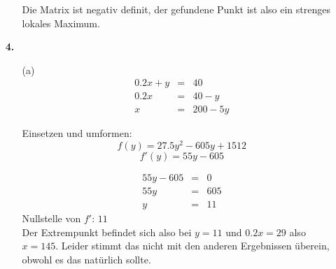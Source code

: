 \documentclass[a4paper,11pt,fleqn]{scrartcl}
\begin{document}
\begin{enumerate}
\begin{enumerate}
                Die Matrix ist negativ definit, der gefundene Punkt ist also ein strenges lokales Maximum.
        \end{enumerate}
    \item[\textbf{4.}]
        \begin{enumerate}
            \item[(a)]
                \begin{eqnarray*}
                    0.2x+y &=& 40\\
                    0.2x &=& 40-y\\
                    x &=& 200 - 5y 
                \end{eqnarray*}

                Einsetzen und umformen:
                $$f(y) = 27.5y^2 - 605y + 1512$$
                $$f'(y) = 55y - 605$$


                \begin{eqnarray*}
                    55y - 605 &=& 0\\
                    55y &=& 605\\
                    y &=& 11
                \end{eqnarray*}
                Nullstelle von $f'$: $11$ \\
                Der Extrempunkt befindet sich also bei $y = 11$ und $0.2x = 29$ also $x = 145$.
                Leider stimmt das nicht mit den anderen Ergebnissen überein, obwohl es das natürlich sollte.
        \end{enumerate}
\end{enumerate}
\end{document}
